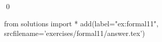 
\begin{ex} 
  \label{ex:formal11}
  
  \qed
\end{ex} 
\begin{python0}
from solutions import *
add(label="ex:formal11",
    srcfilename='exercises/formal11/answer.tex') 
\end{python0}
